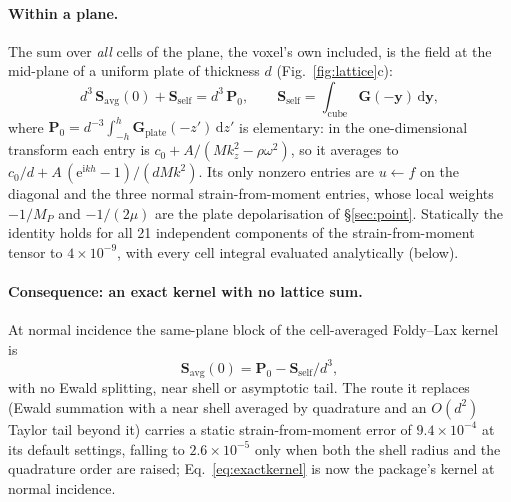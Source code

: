 \documentclass[11pt,a4paper]{article}
\newcommand{\bS}{\mathbf{S}}
\newcommand{\bP}{\mathbf{P}}
\newcommand{\bG}{\mathbf{G}}
\newcommand{\dd}{\mathrm{d}}
\begin{document}
\paragraph{Within a plane.} The sum over \emph{all} cells of the plane, the voxel's own included,
is the field at the mid-plane of a uniform plate of thickness $d$ (Fig.~\ref{fig:lattice}c):
\begin{equation}\label{eq:tiling}
  d^3\,\bS_{\text{avg}}(0)+\bS_{\text{self}}=d^3\,\bP_0,
  \qquad
  \bS_{\text{self}}=\int_{\text{cube}}\bG(-\mathbf y)\,\dd\mathbf y,
\end{equation}
where $\bP_0=d^{-3}\int_{-h}^{h}\bG_{\text{plate}}(-z')\,\dd z'$ is elementary: in the one-dimensional
transform each entry is $c_0+A/(Mk_z^2-\rho\omega^2)$, so it averages to
$c_0/d+A\,(\mathrm{e}^{\mathrm{i}kh}-1)/(dMk^2)$. Its only nonzero entries are $u\leftarrow f$ on the diagonal and the
three normal strain-from-moment entries, whose local weights $-1/M_P$ and $-1/(2\mu)$ are the plate
depolarisation of \S\ref{sec:point}. Statically the identity holds for all 21 independent components
of the strain-from-moment tensor to $4\times10^{-9}$, with every cell integral evaluated analytically
(below).

\paragraph{Consequence: an exact kernel with no lattice sum.} At normal incidence the same-plane
block of the cell-averaged Foldy--Lax kernel is
\begin{equation}\label{eq:exactkernel}
  \bS_{\text{avg}}(0)=\bP_0-\bS_{\text{self}}/d^3 ,
\end{equation}
with no Ewald splitting, near shell or asymptotic tail. The route it replaces (Ewald summation
with a near shell averaged by quadrature and an $O(d^2)$ Taylor tail beyond it) carries a static
strain-from-moment error of $9.4\times10^{-4}$ at its default settings, falling to $2.6\times10^{-5}$
only when both the shell radius and the quadrature order are raised; Eq.~\eqref{eq:exactkernel} is
now the package's kernel at normal incidence.
\end{document}
